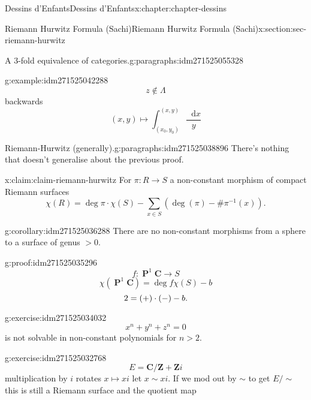 \documentclass[oneside,10pt,]{book}
\newcommand{\qedhere}{\relax}
\numberwithin{equation}{section}
\newcommand{\diff}{\mathop{}\!\mathrm{d}}
\newcommand{\inv}{^{-1}}
\newcommand{\ZZ}{\mathbf{Z}}
\newcommand{\CC}{\mathbf{C}}
\DeclareMathOperator{\PP}{\mathbf{P}}
\newcommand{\gt}{>}
\begin{document}
\begin{chapterptx}{Dessins d'Enfants}{}{Dessins d'Enfants}{}{}{x:chapter:chapter-dessins}
\begin{sectionptx}{Riemann Hurwitz Formula (Sachi)}{}{Riemann Hurwitz Formula (Sachi)}{}{}{x:section:sec-riemann-hurwitz}
\begin{paragraphs}{A 3-fold equivalence of categories.}{g:paragraphs:idm271525055328}
\begin{example}{}{g:example:idm271525042288}
\begin{equation*}
\end{equation*}
%
\begin{equation*}
z\not\in \Lambda
\end{equation*}
backwards%
\begin{equation*}
(x,y) \mapsto \int_{(x_0, y_0)}^{(x,y)} \frac{\diff x}{y}
\end{equation*}
%
\end{example}
\end{paragraphs}%
\begin{paragraphs}{Riemann-Hurwitz (generally).}{g:paragraphs:idm271525038896}%
There's nothing that doesn't generalise about the previous proof.%
\begin{claim}{}{}{x:claim:claim-riemann-hurwitz}%
For \(\pi\colon R\to S\) a non-constant morphism of compact Riemann surfaces%
\begin{equation*}
\chi(R) = \deg \pi \cdot \chi(S)  - \sum_{x\in S} (\deg(\pi) - \#\pi\inv(x))\text{.}
\end{equation*}
%
\end{claim}
\begin{corollary}{}{}{g:corollary:idm271525036288}%
There are no non-constant morphisms from a sphere to a surface of genus \(\gt 0\).%
\end{corollary}
\begin{proofptx}{}{g:proof:idm271525035296}
%
\begin{equation*}
f\colon \PP^1 \CC \to S
\end{equation*}
%
\begin{equation*}
\chi(\PP^1 \CC) = \deg f \chi(S) - b
\end{equation*}
%
\begin{equation*}
2 = (+)\cdot (-) - b\text{.}\qedhere
\end{equation*}
%
\end{proofptx}
\begin{inlineexercise}{}{g:exercise:idm271525034032}%
%
\begin{equation*}
x^n  +y^ n + z^n = 0
\end{equation*}
is not solvable in non-constant polynomials for \(n \gt 2\).%
\end{inlineexercise}
\begin{inlineexercise}{}{g:exercise:idm271525032768}%
%
\begin{equation*}
E = \CC/ \ZZ + \ZZ i
\end{equation*}
multiplication by \(i\) rotates \(x \mapsto xi\) let \(x \sim xi\). If we mod out by \(\sim\) to get \(E/\sim\) this is still a Riemann surface and the quotient map%

\end{inlineexercise}
\end{paragraphs}
\end{sectionptx}
\end{chapterptx}
\end{document}
